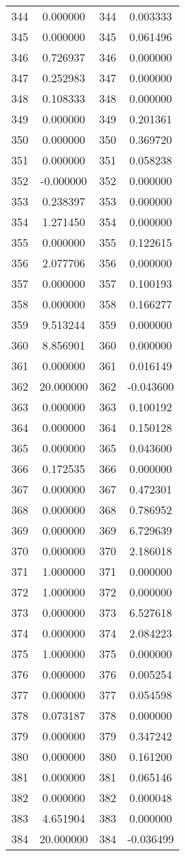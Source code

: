 \documentclass[12pt]{article}
\begin{document}
\begin{longtable}{@{}cccc@{}}
344 & 0.000000 & 344 & 0.003333 \\
345 & 0.000000 & 345 & 0.061496 \\
346 & 0.726937 & 346 & 0.000000 \\
347 & 0.252983 & 347 & 0.000000 \\
348 & 0.108333 & 348 & 0.000000 \\
349 & 0.000000 & 349 & 0.201361 \\
350 & 0.000000 & 350 & 0.369720 \\
351 & 0.000000 & 351 & 0.058238 \\
352 & -0.000000 & 352 & 0.000000 \\
353 & 0.238397 & 353 & 0.000000 \\
354 & 1.271450 & 354 & 0.000000 \\
355 & 0.000000 & 355 & 0.122615 \\
356 & 2.077706 & 356 & 0.000000 \\
357 & 0.000000 & 357 & 0.100193 \\
358 & 0.000000 & 358 & 0.166277 \\
359 & 9.513244 & 359 & 0.000000 \\
360 & 8.856901 & 360 & 0.000000 \\
361 & 0.000000 & 361 & 0.016149 \\
362 & 20.000000 & 362 & -0.043600 \\
363 & 0.000000 & 363 & 0.100192 \\
364 & 0.000000 & 364 & 0.150128 \\
365 & 0.000000 & 365 & 0.043600 \\
366 & 0.172535 & 366 & 0.000000 \\
367 & 0.000000 & 367 & 0.472301 \\
368 & 0.000000 & 368 & 0.786952 \\
369 & 0.000000 & 369 & 6.729639 \\
370 & 0.000000 & 370 & 2.186018 \\
371 & 1.000000 & 371 & 0.000000 \\
372 & 1.000000 & 372 & 0.000000 \\
373 & 0.000000 & 373 & 6.527618 \\
374 & 0.000000 & 374 & 2.084223 \\
375 & 1.000000 & 375 & 0.000000 \\
376 & 0.000000 & 376 & 0.005254 \\
377 & 0.000000 & 377 & 0.054598 \\
378 & 0.073187 & 378 & 0.000000 \\
379 & 0.000000 & 379 & 0.347242 \\
380 & 0.000000 & 380 & 0.161200 \\
381 & 0.000000 & 381 & 0.065146 \\
382 & 0.000000 & 382 & 0.000048 \\
383 & 4.651904 & 383 & 0.000000 \\
384 & 20.000000 & 384 & -0.036499 \\

\end{longtable}
\end{document}

